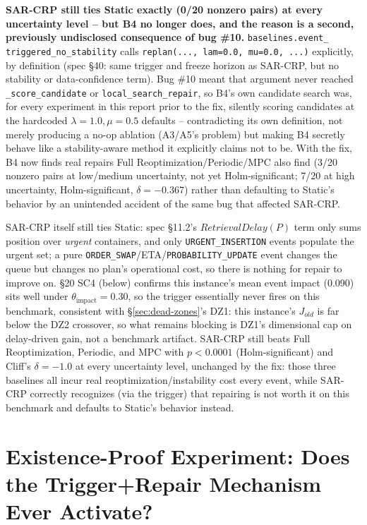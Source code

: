 \documentclass[11pt]{article}
\begin{document}
\textbf{SAR-CRP still ties Static exactly (0/20 nonzero pairs) at every
uncertainty level -- but B4 no longer does, and the reason is a second,
previously undisclosed consequence of bug \#10.} \texttt{baselines.event\_
triggered\_no\_stability} calls \texttt{replan(..., lam=0.0, mu=0.0, ...)}
explicitly, by definition (spec \S40: same trigger and freeze horizon as
SAR-CRP, but no stability or data-confidence term). Bug \#10 meant that
argument never reached \texttt{\_score\_candidate} or
\texttt{local\_search\_repair}, so B4's own candidate search was, for
every experiment in this report prior to the fix, silently scoring
candidates at the hardcoded $\lambda{=}1.0,\mu{=}0.5$ defaults --
contradicting its own definition, not merely producing a no-op ablation
(A3/A5's problem) but making B4 secretly behave like a stability-aware
method it explicitly claims not to be. With the fix, B4 now finds real
repairs Full Reoptimization/Periodic/MPC also find (3/20 nonzero pairs at
low/medium uncertainty, not yet Holm-significant; 7/20 at high
uncertainty, Holm-significant, $\delta=-0.367$) rather than defaulting to
Static's behavior by an unintended accident of the same bug that affected
SAR-CRP.

SAR-CRP itself still ties Static: spec \S11.2's
$\mathit{RetrievalDelay}(P)$ term only sums position over \emph{urgent}
containers, and only \texttt{URGENT\_INSERTION} events populate the urgent
set; a pure \texttt{ORDER\_SWAP}/ETA/\texttt{PROBABILITY\_UPDATE} event
changes the queue but changes no plan's operational cost, so there is
nothing for repair to improve on. \S20 SC4 (below) confirms this
instance's mean event impact (0.090) sits well under
$\theta_{\text{impact}}=0.30$, so the trigger essentially never fires on
this benchmark, consistent with \S\ref{sec:dead-zones}'s DZ1: this
instance's $J_{old}$ is far below the DZ2 crossover, so what remains
blocking is DZ1's dimensional cap on delay-driven gain, not a benchmark
artifact. SAR-CRP still beats Full Reoptimization, Periodic, and MPC with
$p<0.0001$ (Holm-significant) and Cliff's $\delta=-1.0$ at every
uncertainty level, unchanged by the fix: those three baselines all incur
real reoptimization/instability cost every event, while SAR-CRP correctly
recognizes (via the trigger) that repairing is not worth it on this
benchmark and defaults to Static's behavior instead.

\section{Existence-Proof Experiment: Does the Trigger+Repair Mechanism Ever Activate?}
\label{sec:existence-proof}
\end{document}
